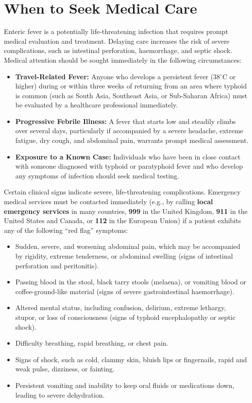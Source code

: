 \section*{When to Seek Medical Care}
Enteric fever is a potentially life-threatening infection that requires prompt medical evaluation and treatment. Delaying care increases the risk of severe complications, such as intestinal perforation, haemorrhage, and septic shock.
Medical attention should be sought immediately in the following circumstances:
\begin{itemize}
\item \textbf{Travel-Related Fever:} Anyone who develops a persistent fever (38$^\circ$C or higher) during or within three weeks of returning from an area where typhoid is common (such as South Asia, Southeast Asia, or Sub-Saharan Africa) must be evaluated by a healthcare professional immediately.
\item \textbf{Progressive Febrile Illness:} A fever that starts low and steadily climbs over several days, particularly if accompanied by a severe headache, extreme fatigue, dry cough, and abdominal pain, warrants prompt medical assessment.
\item \textbf{Exposure to a Known Case:} Individuals who have been in close contact with someone diagnosed with typhoid or paratyphoid fever and who develop any symptoms of infection should seek medical testing.
\end{itemize}

\noindent Certain clinical signs indicate severe, life-threatening complications. Emergency medical services must be contacted immediately (e.g., by calling \textbf{local emergency services} in many countries, \textbf{999} in the United Kingdom, \textbf{911} in the United States and Canada, or \textbf{112} in the European Union) if a patient exhibits any of the following ``red flag'' symptoms:
\begin{itemize}
\item Sudden, severe, and worsening abdominal pain, which may be accompanied by rigidity, extreme tenderness, or abdominal swelling (signs of intestinal perforation and peritonitis).
\item Passing blood in the stool, black tarry stools (melaena), or vomiting blood or coffee-ground-like material (signs of severe gastrointestinal haemorrhage).
\item Altered mental status, including confusion, delirium, extreme lethargy, stupor, or loss of consciousness (signs of typhoid encephalopathy or septic shock).
\item Difficulty breathing, rapid breathing, or chest pain.
\item Signs of shock, such as cold, clammy skin, bluish lips or fingernails, rapid and weak pulse, dizziness, or fainting.
\item Persistent vomiting and inability to keep oral fluids or medications down, leading to severe dehydration.
\end{itemize}

